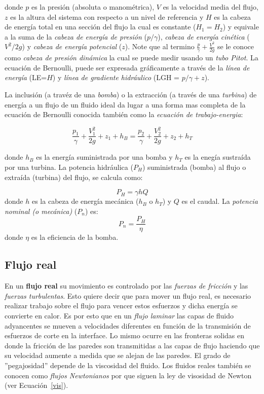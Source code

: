 \documentclass[11pt, oneside]{article}
\begin{document}
donde $p$ es la presi\'on (absoluta o manom\'etrica), $V$ es la velocidad media del flujo, $z$ es la altura del sistema con respecto a un nivel de referencia y $H$ es la cabeza de energ\'ia total en una secci\'on del flujo la cual es constante ($H_1 = H_2 $) y equivale a la suma de la \emph{cabeza de energ\'ia de presi\'on} ($p/\gamma$), \emph{cabeza de energ\'ia cin\'etica} ($V^2 /2g$) y \emph{cabeza de energ\'ia potencial} ($z$). Note que al termino $\frac{p}{\gamma} + \frac{V^2}{2g}$ se le conoce como \emph{cabeza de presi\'on din\'amica} la cual se puede medir usando un \emph{tubo Pitot}. La ecuaci\'on de Bernoulli, puede ser expresada gr\'aficamente a trav\'es de la \emph{l\'inea de energ\'ia} (LE=$H$) y \emph{l\'inea de gradiente hidr\'aulico} (LGH = $p/\gamma + z$).

La inclusi\'on (a trav\'ez de una \emph{bomba}) o la extracci\'on (a trav\'es de una \emph{turbina}) de energ\'ia a un flujo de un fluido ideal da lugar a una forma mas completa de la ecuaci\'on de Bernoulli conocida tambi\'en como la \emph{ecuaci\'on de trabajo-energia}:

\begin{equation}
\frac{p_1}{\gamma} + \frac{V_1^2}{2g} + z_1 + h_B =\frac{p_2}{\gamma} + \frac{V_2^2}{2g} + z_2 + h_T
\end{equation}

donde $h_B$ es la energ\'ia suministrada por una bomba y $h_T$ es la eneg\'ia sustra\'ida por una turbina. La potencia hidr\'aulica ($P_H$) suministrada (bomba) al flujo o extra\'ida (turbina) del flujo, se calcula como:

\begin{equation}
P_H = \gamma h Q
\end{equation}
donde $h$ es la cabeza de energ\'ia mec\'anica ($h_B$ o $h_T$) y $Q$ es el caudal. La \emph{potencia nominal (o mec\'anica)} ($P_n$) es:
\begin{equation}
P_n = \frac{P_H}{\eta}
\end{equation}
donde $\eta$ es la eficiencia de la bomba.

 
\subsection{Flujo real}
En un \textbf{flujo real} su movimiento es controlado por las \emph{fuerzas de fricci\'on} y las \emph{fuerzas turbulentas}. Esto quiere decir que para mover un flujo real, es necesario realizar trabajo sobre el flujo para vencer estos esfuerzos y dicha energ\'ia se convierte en calor. Es por esto que en un \emph{flujo laminar} las capas de fluido adyancentes se mueven a velocidades diferentes en funci\'on de la transmisi\'on de esfuerzos de corte en la interface. Lo mismo ocurre en las fronteras solidas en donde la fricci\'on de las paredes son transmitidas a las capas de flujo haciendo que su velocidad aumente a medida que se alejan de las paredes. El grado de ''pegajosidad'' depende de la viscosidad del fluido. Los fluidos reales tambi\'en se conocen como \emph{flujos Newtonianos} por que siguen la ley de visosidad de Newton (ver Ecuaci\'on~\ref{vis}).
\end{document}

